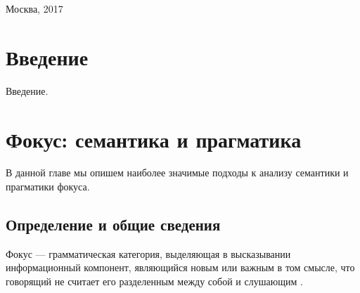 \documentclass[a4paper, titlepage, 12pt]{article}
\begin{document}
\begin{titlepage}


{\large Москва, 2017} %


 


\end{titlepage}

\thispagestyle{empty} 
\tableofcontents
\thispagestyle{empty}

\clearpage


\section[Введение]{Введение}

Введение.

\setcounter{page}{1}

\section{Фокус: семантика и прагматика}

В данной главе мы опишем наиболее значимые подходы к анализу семантики и прагматики фокуса. 

\subsection{Определение и общие сведения}

Фокус --- грамматическая категория, выделяющая в высказывании информационный компонент, являющийся новым или важным в том смысле, что говорящий не считает его разделенным между собой и слушающим \citep{Jackendoff1972}.
\end{document}
